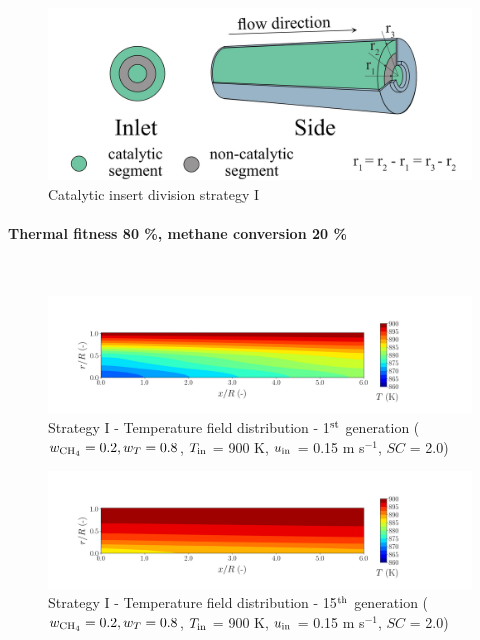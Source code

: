 \documentclass[preprint,12pt]{elsarticle}
\begin{document}
\begin{figure}[h!]
\centering
\includegraphics[width=120mm]{5seg.png}
\caption{\label{fig:5seg}Catalytic insert division strategy I}
\end{figure}


\paragraph{Thermal fitness 80 \%, methane conversion 20 \%} \hspace{0pt} \\
\noindent 

\begin{figure}[h!]
\centering
\includegraphics[width=190mm]{results/5/20C_80T/GEN1-TFIELD.png}
\caption{\label{fig:5R2080G1-TField} Strategy I - Temperature field distribution - 1$^{\rm{st}}$ generation ($w_{\rm{CH_4}} = 0.2, w_T = 0.8$, $T_{\rm{in}}$ = 900 K, $u_{\rm{in}}$ = 0.15 m s$^{-1}$, $SC$ = 2.0)}
\end{figure}

\begin{figure}[h!]
\centering
\includegraphics[width=190mm]{results/5/20C_80T/GEN15-TFIELD.png}
\caption{\label{fig:5R2080G15-TField} Strategy I - Temperature field distribution - 15$^{\rm{th}}$ generation ($w_{\rm{CH_4}} = 0.2, w_T = 0.8$, $T_{\rm{in}}$ = 900 K, $u_{\rm{in}}$ = 0.15 m s$^{-1}$, $SC$ = 2.0)}
\end{figure}
\end{document}
